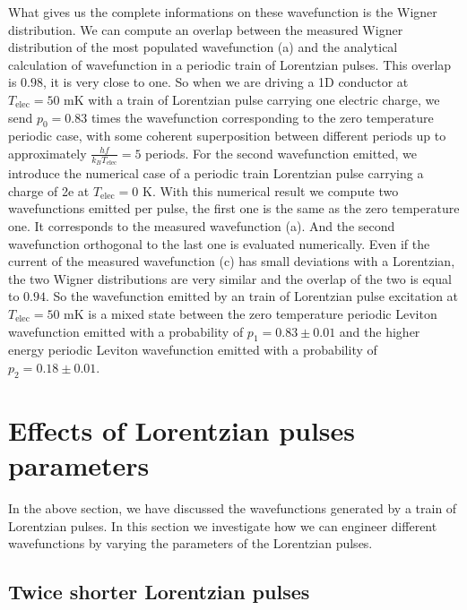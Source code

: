 What gives us the complete informations on these wavefunction is the Wigner distribution.
We can compute an overlap between the measured Wigner distribution of the most populated wavefunction (a) and the analytical calculation of wavefunction in a periodic train of Lorentzian pulses.
This overlap is $0.98$, it is very close to one.
So when we are driving a 1D conductor at $T_{\mathrm{elec}}=50$ mK with a train of Lorentzian pulse carrying one electric charge, we send $p_{0} = 0.83$ times the wavefunction corresponding to the zero temperature periodic case, with some coherent superposition between different periods up to approximately $\frac{hf}{k_{B}T_{\mathrm{elec}}} = 5$ periods.
For the second wavefunction emitted, we introduce the numerical case of a periodic train Lorentzian pulse carrying a charge of 2e at $T_{\mathrm{elec}} = 0$ K.
With this numerical result we compute two wavefunctions emitted per pulse, the first one is the same as the zero temperature one.
It corresponds to the measured wavefunction (a).
And the second wavefunction orthogonal to the last one is evaluated numerically.
Even if the current of the measured wavefunction (c) has small deviations with a Lorentzian, the two Wigner distributions are very similar and the overlap of the two is equal to $0.94$.
So the wavefunction emitted by an train of Lorentzian pulse excitation at $T_{\mathrm{elec}}=50$ mK is a mixed state between the zero temperature periodic Leviton wavefunction emitted with a probability of $p_{1} = 0.83 \pm 0.01$ and the higher energy periodic Leviton wavefunction emitted with a probability of $p_{2} = 0.18 \pm 0.01$.

\section{\texorpdfstring{Effects of Lorentzian pulses parameters}{Effects of Lorentzian pulses parameters} \label{sec: Effects of Lorentzian pulses parameters}}

In the above section, we have discussed the wavefunctions generated by a train of Lorentzian pulses.
In this section we investigate how we can engineer different wavefunctions by varying the parameters of the Lorentzian pulses.

\subsection{Twice shorter Lorentzian pulses}

